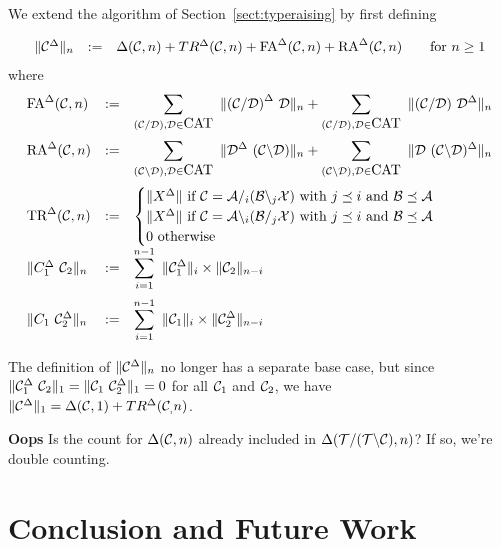 \documentclass[10pt]{article}
\begin{document}
We extend the algorithm of Section~\ref{sect:typeraising} by first defining

\[
    \begin{array}{lcl}
    \|{\cal C}^\Delta\|_n &:=& \Delta({\cal C},n) + TR^\Delta({\cal C},n) + \mbox{FA}^\Delta({\cal C},n) + \mbox{RA}^\Delta({\cal C},n)\qquad\mbox{for $n\geq 1$}
    \end{array}
\]
where
\[
    \begin{array}{lcl}
        \FA^\Delta(\C,n) &:=& \displaystyle\sum_{(\C/\D),\D\in\CAT}\  \|{(\C/\D)}^\Delta\ \D\|_n + \sum_{(\C/\D),\D\in\CAT}\  \|(\C/\D)\ \D^\Delta\|_n\\
        \noalign{\medskip}
        \RA^\Delta(\C,n) &:=& \displaystyle\sum_{(\C\backslash\D),\D\in\CAT}\ \| \D^\Delta\ (\C\backslash \D)\|_n + \sum_{(\C\backslash\D),\D\in\CAT}\ \| \D\ (\C\backslash \D)^\Delta\|_n\\
        \noalign{\medskip}
        \TR^\Delta(\C,n) &:=& \begin{cases}
                            \|X^\Delta\| \mbox{\ if\ }\C = \A /_i (\B \backslash_j \X) \mbox{\ with\ } j \preceq i \mbox{\ and\ } \B \preceq \A\\
                            \|X^\Delta\| \mbox{\ if\ }\C = \A \backslash_i (\B /_j \X) \mbox{\ with\ } j \preceq i \mbox{\ and\ } \B \preceq \A\\
                            0\mbox{\ otherwise}\\
        \end{cases}\\
        \|C_1^\Delta\ \C_2\|_n &:=& \displaystyle\sum_{i=1}^{n-1}\ \|\C_1^\Delta\|_i\times\|\C_2\|_{n-i}\\
    \noalign{\medskip}
    \|C_1\ \C_2^\Delta\|_n &:=& \displaystyle\sum_{i=1}^{n-1}\ \|\C_1\|_i\times\|\C_2^\Delta\|_{n-i}\\
\end{array}
\]

The definition of \(\|{\cal C}^\Delta\|_n\) no longer has a separate base case, but since \(\|{\cal C}_1^\Delta\ {\cal C}_2\|_1 = \|{\cal C}_1\ {\cal C}_2^\Delta\|_1 = 0\) for all \({\cal C}_1\) and \({\cal C}_2\), we have \(\|{\cal C}^\Delta\|_1 = \Delta({\cal C},1) + TR^\Delta({\cal C}_,n)\).

\bigskip

\textbf{\Large Oops} Is the count for \(\Delta({\cal C},n)\) already included in \(\Delta({\cal T}/({\cal T}\backslash{\cal C}), n)\)? If so, we're double counting.



\section{Conclusion and Future Work}
\end{document}
